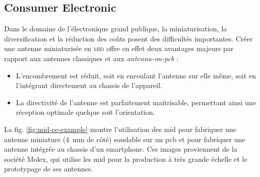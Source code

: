 \subsection{Consumer Electronic}
Dans le domaine de l'électronique grand publique, la miniaturisation, la diversification et la réduction des coûts posent des difficultés importantes.
Créer une antenne miniaturisée en \textsc{mid} offre en effet deux avantages majeurs par rapport aux antennes classiques et aux \textit{antenna-on-pcb} :
\begin{itemize}
    \item L'encombrement est réduit, soit en enroulant l'antenne sur elle même, soit en l'intégrant directement au chassis de l'appareil.
    \item La directivité de l'antenne est parfaitement maitrisable, permettant ainsi une réception optimale quelque soit l'orientation.
\end{itemize}
La fig. \ref{fig:mid-ce-example} montre l'utilisation des \gls{mid} pour fabriquer une antenne miniature (\SI{4}{\milli\meter} de côté) soudable sur un \gls{pcb} et pour fabriquer une antenne intégrée au chassis d'un smartphone.
Ces images proviennent de la société Molex, qui utilise les \gls{mid} pour la production à très grande échelle et le prototypage de ses antennes.

